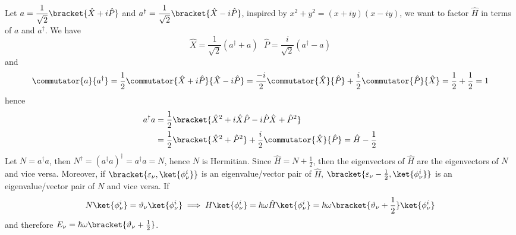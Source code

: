 Let \(a = \dfrac{1}{\sqrt{2}} \bracket{\hat{X} + i \hat{P}}\) and \(a^{\dagger} = \dfrac{1}{\sqrt{2}} \bracket{\hat{X} - i \hat{P}}\), inspired by \(x^2 + y^2 = (x + iy)(x - iy)\), we want to factor \(\hat{H}\) in terms of \(a\) and \(a^{\dagger}\). We have
\begin{equation*}
    \hat{X} = \frac{1}{\sqrt{2}} (a^{\dagger} + a) \ \ \ \hat{P} = \frac{i}{\sqrt{2}} (a^{\dagger} - a)
\end{equation*}
and
\begin{equation*}
    \commutator{a}{a^{\dagger}} = \dfrac{1}{2} \commutator{\hat{X} + i \hat{P}}{\hat{X} - i \hat{P}} = \dfrac{-i}{2} \commutator{\hat{X}}{\hat{P}} + \dfrac{i}{2} \commutator{\hat{P}}{\hat{X}} = \frac{1}{2} + \frac{1}{2} = 1
\end{equation*}
hence
\begin{align*}
    a^{\dagger} a & = \frac{1}{2} \bracket{\hat{X}^2 + i \hat{X}\hat{P} - i \hat{P}\hat{X} + \hat{P}^2}                                \\
                  & = \frac{1}{2} \bracket{\hat{X}^2  + \hat{P}^2} + \frac{i}{2} \commutator{\hat{X}}{\hat{P}} = \hat{H} - \frac{1}{2}
\end{align*}
Let \(N = a^{\dagger} a\), then \(N^{\dagger} = (a^{\dagger} a)^{\dagger} = a^{\dagger} a = N\), hence \(N\) is Hermitian. Since \(\hat{H} = N + \frac{1}{2}\), then the eigenvectors of \(\hat{H}\) are the eigenvectors of \(N\) and vice versa. Moreover, if \(\bracket{\varepsilon_{\nu},\ket{\phi_{\nu}^i}}\) is an eigenvalue/vector pair  of \(\hat{H}\), \(\bracket{\varepsilon_{\nu} - \frac{1}{2},\ket{\phi_{\nu}^i}}\) is an eigenvalue/vector pair of \(N\) and vice versa.  If  \begin{equation*}
    N\ket{\phi_{\nu}^i} = \vartheta_{\nu} \ket{\phi_{\nu}^i} \implies H \ket{\phi_{\nu}^i} = \hbar \omega \hat{H} \ket{\phi_{\nu}^i} = \hbar \omega \bracket{\vartheta_{\nu} + \frac{1}{2}} \ket{\phi_{\nu}^i}
\end{equation*}
and therefore \(E_{\nu} = \hbar \omega \bracket{\vartheta_{\nu}  + \frac{1}{2}}\).
